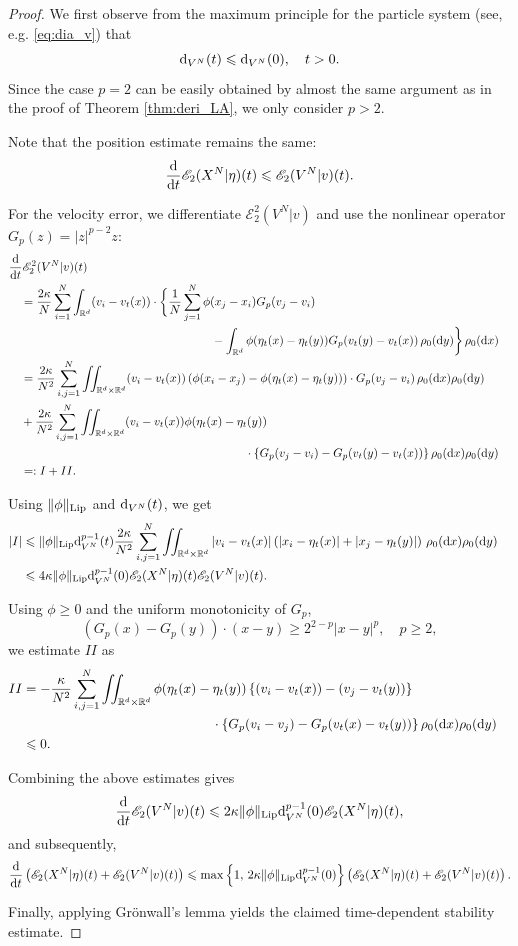 \documentclass[10pt,reqno]{amsart}
\renewcommand{\geq}{\geqslant}
\renewcommand{\ge}{\geqslant}
\renewcommand{\leq}{\leqslant}
\numberwithin{equation}{section}
\newcommand{\R}{\mathbb R}
\newcommand{\lt}{\left}
\newcommand{\rt}{\right}
\newcommand{\intr}{\int_{\R^d}}
\newcommand{\intrr}{\iint_{\R^d \times \R^d}}
\newcommand{\rd}{\textnormal{d}}
\newcommand{\dx}{\textnormal{d}x}
\newcommand{\dt}{\textnormal{d}t}
\newcommand{\dy}{\textnormal{d}y}
\begin{document}
 \begin{proof} We first observe from the maximum principle for the particle system (see, e.g. \eqref{eq:dia_v}) that
 \[
\rd_{V^N}(t) \leq \rd_{V^N}(0), \quad t >0.
 \]
 Since the case $p=2$ can be easily obtained by almost the same argument as in the proof of Theorem \ref{thm:deri_LA}, we only consider $p > 2$.
 
Note that the position estimate remains the same:
\[
\frac{\rd}{\dt} \mathscr{E}_2(X^N|\eta)(t) \leq \mathscr{E}_2(V^N|v)(t).
\]

For the velocity error, we differentiate $\mathscr{E}_2^2(V^N|v)$ and use the nonlinear operator $G_p(z)=|z|^{p-2}z$:
\begin{align*}
&\frac{\rd}{\dt} \mathscr{E}_2^2(V^N|v)(t) \cr
&\quad = \frac {2\kappa}N \sum_{i=1}^N \intr  (v_i - v_t(x))\cdot \bigg\{\frac1N \sum_{j=1}^N\phi (x_j - x_i)G_p(v_j - v_i)  \cr
&\hspace{6cm} - \intr \phi(\eta_t(x) - \eta_t(y))  G_p(v_t(y) - v_t(x))\,\rho_0(\dy) \bigg\}\,\rho_0(\dx)\cr
&\quad = \frac {2\kappa}{N^2} \sum_{i,j=1}^N \intrr  (v_i - v_t(x)) \lt(\phi(x_i - x_j) - \phi(\eta_t(x) - \eta_t(y)) \rt)   \cdot G_p(v_j - v_i) \,\rho_0(\dx)\rho_0(\dy) \cr
&\quad + \frac {2\kappa}{N^2} \sum_{i,j=1}^N \intrr  (v_i - v_t(x)) \phi(\eta_t(x) - \eta_t(y)) \cr
&\hspace{7cm} \cdot  \lt\{ G_p(v_j - v_i)  -  G_p(v_t(y) - v_t(x)) \rt\}   \rho_0(\dx)\rho_0(\dy) \cr
&\quad =: I + II.
\end{align*}

Using $\|\phi\|_{\rm Lip}$ and $\rd_{V^N}(t)$, we get
 \begin{align*}
|I| &\leq \|\phi\|_{\rm Lip} \rd^{p-1}_{V^N}(t)\frac {2\kappa}{N^2} \sum_{i,j=1}^N \intrr |v_i - v_t(x)|  \lt( |x_i - \eta_t(x)| + |x_j  - \eta_t(y)|\rt)\,\rho_0(\dx)\rho_0(\dy)\cr
 &\leq 4\kappa\|\phi\|_{\rm Lip} \rd^{p-1}_{V^N}(0) \mathscr{E}_2(X^N|\eta)(t) \mathscr{E}_2(V^N|v)(t).
 \end{align*}

Using $\phi\ge0$ and the uniform monotonicity of $G_p$,
  \[
( G_p(x) - G_p(y)) \cdot (x-y) \geq 2^{2-p}|x-y|^p, \quad p \ge 2,
  \]
 we estimate $II$ as 
 \begin{align*}
II &= -\frac \kappa{N^2} \sum_{i,j=1}^N \intrr \phi(\eta_t(x) - \eta_t(y)) \lt\{(v_i - v_t(x)) - (v_j - v_t(y))\rt\} \cr
& \hspace{5cm} \cdot \lt\{G_p(v_i - v_j) - G_p(v_t(x) - v_t(y))   \rt\} \rho_0(\dx)\rho_0(\dy)\cr
 &\leq 0.
  \end{align*}
   
Combining the above estimates gives
\[
\frac{\rd}{\dt} \mathscr{E}_2(V^N|v)(t) \leq  2\kappa\|\phi\|_{\rm Lip} \rd^{p-1}_{V^N}(0) \mathscr{E}_2(X^N|\eta)(t),
\]
and subsequently,
\[
\frac{\rd}{\dt} \lt(  \mathscr{E}_2(X^N|\eta)(t) +  \mathscr{E}_2(V^N|v)(t) \rt) \leq \max\lt\{ 1, \, 2\kappa\|\phi\|_{\rm Lip} \rd^{p-1}_{V^N}(0) \rt\} \lt(  \mathscr{E}_2(X^N|\eta)(t) +  \mathscr{E}_2(V^N|v)(t) \rt).
\]

Finally, applying Gr\"onwall's lemma yields the claimed time-dependent stability estimate.
 \end{proof}
 
\end{document}
